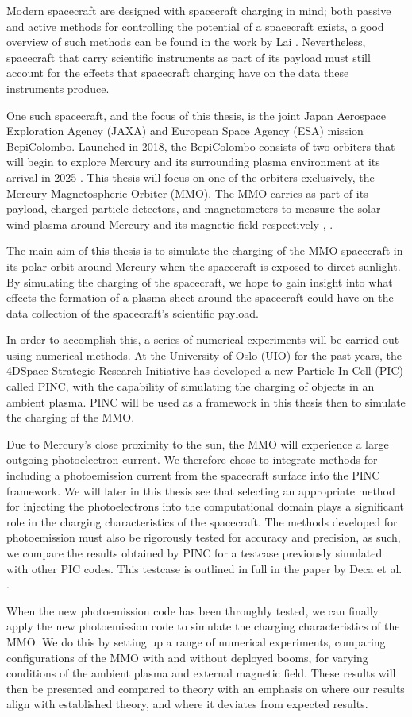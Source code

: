 Modern spacecraft are designed with spacecraft charging in mind; both passive and active methods for controlling the potential of a spacecraft exists, a good overview of such methods can be found in the work by Lai \parencite{Lai2003}. Nevertheless, spacecraft that carry scientific instruments as part of its payload must still account for the effects that spacecraft charging have on the data these instruments produce. 

One such spacecraft, and the focus of this thesis, is the joint Japan Aerospace Exploration Agency (JAXA) and European Space Agency (ESA) mission BepiColombo. Launched in 2018, the BepiColombo consists of two orbiters that will begin to explore Mercury and its surrounding plasma environment at its arrival in 2025 \parencite{Benkhoff2009}. This thesis will focus on one of the orbiters exclusively, the Mercury Magnetospheric Orbiter (MMO). The MMO carries as part of its payload, charged particle detectors, and magnetometers to measure the solar wind plasma around Mercury and its magnetic field respectively \parencite{Saito2010}, \parencite{Benkhoff2009}. 

The main aim of this thesis is to simulate the charging of the MMO spacecraft in its polar orbit around Mercury when the spacecraft is exposed to direct sunlight. By simulating the charging of the spacecraft, we hope to gain insight into what effects the formation of a plasma sheet around the spacecraft could have on the data collection of the spacecraft's scientific payload.

In order to accomplish this, a series of numerical experiments will be carried out using numerical methods. At the University of Oslo (UIO) for the past years, the 4DSpace Strategic Research Initiative has developed a new Particle-In-Cell (PIC) called PINC, with the capability of simulating the charging of objects in an ambient plasma. PINC will be used as a framework in this thesis then to simulate the charging of the MMO.

Due to Mercury's close proximity to the sun, the MMO will experience a large outgoing photoelectron current. We therefore chose to integrate methods for including a photoemission current from the spacecraft surface into the PINC framework. We will later in this thesis see that selecting an appropriate method for injecting the photoelectrons into the computational domain plays a significant role in the charging characteristics of the spacecraft. The methods developed for photoemission must also be rigorously tested for accuracy and precision, as such, we compare the results obtained by PINC for a testcase previously simulated with other PIC codes. This testcase is outlined in full in the paper by Deca et al. \parencite{Deca2013}.

When the new photoemission code has been throughly tested, we can finally apply the new photoemission code to simulate the charging characteristics of the MMO. We do this by setting up a range of numerical experiments, comparing configurations of the MMO with and without deployed booms, for varying conditions of the ambient plasma and external magnetic field. These results will then be presented and compared to theory with an emphasis on where our results align with established theory, and where it deviates from expected results. 
\newpage